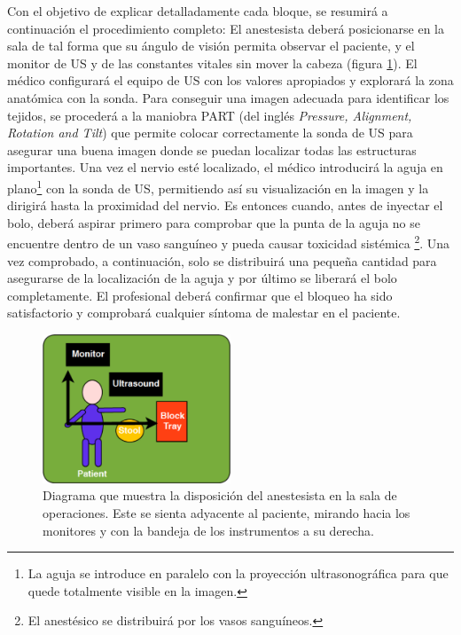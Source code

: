 Con el objetivo de explicar detalladamente cada bloque, se resumirá a continuación el procedimiento completo:
%
El anestesista deberá posicionarse en la sala de tal forma que su ángulo de visión permita observar el paciente, y el monitor de \ac{US} y de las constantes vitales sin mover la cabeza (figura \ref{fig:roomplace}). El médico configurará el equipo de \ac{US} con los valores apropiados y explorará la zona anatómica con la sonda. Para conseguir una imagen adecuada para identificar los tejidos, se procederá a la maniobra PART (del inglés \emph{Pressure, Alignment, Rotation and Tilt}) que permite colocar correctamente la sonda de \ac{US} para asegurar una buena imagen donde se puedan localizar todas las estructuras importantes. Una vez el nervio esté localizado, el médico introducirá la aguja en plano\footnote{La aguja se introduce en paralelo con la proyección ultrasonográfica para que quede totalmente visible en la imagen.} con la sonda de \ac{US}, permitiendo así su visualización en la imagen y la dirigirá hasta la proximidad del nervio. Es entonces cuando, antes de inyectar el bolo, deberá aspirar primero para comprobar que la punta de la aguja no se encuentre dentro de un vaso sanguíneo y pueda causar toxicidad sistémica \footnote{El anestésico se distribuirá por los vasos sanguíneos.}. Una vez comprobado, a continuación, solo se distribuirá una pequeña cantidad para asegurarse de la localización de la aguja y por último se liberará el bolo completamente. El profesional deberá confirmar que el bloqueo ha sido satisfactorio y comprobará cualquier síntoma de malestar en el paciente.


\begin{figure}[th]
   \centering
    \includegraphics[width=0.5\textwidth]{IMG/roomplacement.png}
    \caption{Diagrama que muestra la disposición del anestesista en la sala de operaciones. Este se sienta adyacente al paciente, mirando hacia los monitores y con la bandeja de los instrumentos a su derecha.}
   \label{fig:roomplace}
\end{figure}





